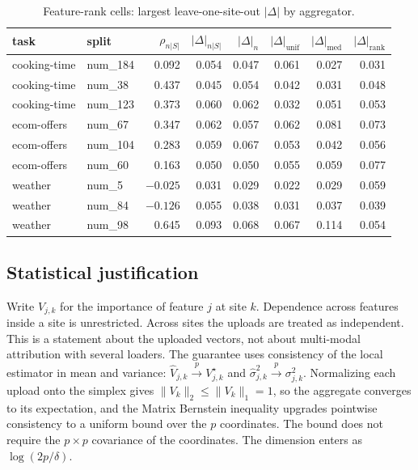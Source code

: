 \begin{table}[t]
\centering
\footnotesize
\setlength{\tabcolsep}{4pt}
\caption{Feature-rank cells: largest leave-one-site-out \(|\Delta|\) by
aggregator.}
\label{tab:tabred-fsds-loso-feat}
\begin{tabular}{@{}ll r r r r r r@{}}
\toprule
task & split & \(\rho_{n|S|}\) & \(|\Delta|_{n|S|}\)
     & \(|\Delta|_n\) & \(|\Delta|_{\mathrm{unif}}\)
     & \(|\Delta|_{\mathrm{med}}\) & \(|\Delta|_{\mathrm{rank}}\) \\
\midrule
cooking-time & num\_184 & 0.092  & 0.054 & 0.047 & 0.061 & 0.027 & 0.031 \\
cooking-time & num\_38  & 0.437  & 0.045 & 0.054 & 0.042 & 0.031 & 0.048 \\
cooking-time & num\_123 & 0.373  & 0.060 & 0.062 & 0.032 & 0.051 & 0.053 \\
ecom-offers  & num\_67  & 0.347  & 0.062 & 0.057 & 0.062 & 0.081 & 0.073 \\
ecom-offers  & num\_104 & 0.283  & 0.059 & 0.067 & 0.053 & 0.042 & 0.056 \\
ecom-offers  & num\_60  & 0.163  & 0.050 & 0.050 & 0.055 & 0.059 & 0.077 \\
weather      & num\_5   & \(-0.025\) & 0.031 & 0.029 & 0.022 & 0.029 & 0.059 \\
weather      & num\_84  & \(-0.126\) & 0.055 & 0.038 & 0.031 & 0.037 & 0.039 \\
weather      & num\_98  & 0.645  & 0.093 & 0.068 & 0.067 & 0.114 & 0.054 \\
\bottomrule
\end{tabular}
\end{table}

\subsection{Statistical justification}
\label{sec:theory}

Write \(V_{j,k}\) for the importance of feature \(j\) at site \(k\).
Dependence across features inside a site is unrestricted.
Across sites the uploads are treated as independent.
This is a statement about the uploaded vectors, not about multi-modal
attribution with several loaders.
The guarantee uses consistency of the local estimator in mean and
variance: \(\hat V_{j,k}\xrightarrow{p} V_{j,k}^{\star}\) and
\(\hat\sigma_{j,k}^2\xrightarrow{p}\sigma_{j,k}^2\).
Normalizing each upload onto the simplex gives
\(\|V_k\|_2\le\|V_k\|_1=1\), so the aggregate converges to its
expectation, and the Matrix Bernstein inequality upgrades pointwise
consistency to a uniform bound over the \(p\) coordinates.
The bound does not require the \(p\times p\) covariance of the
coordinates.
The dimension enters as \(\log(2p/\delta)\).

